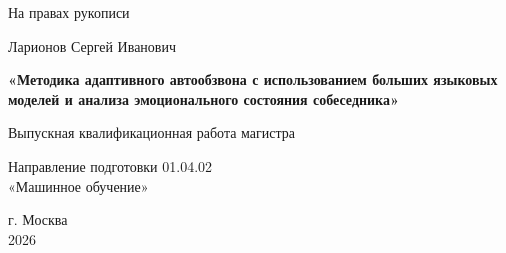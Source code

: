 \documentclass[a4paper,14pt]{extarticle}
\begin{document}
\begin{titlepage}
\fontsize{12pt}{14pt}\selectfont
\singlespacing
{}

\vspace{0.95cm}


\vspace{0.95cm}


\vspace{0.95cm}


\vspace{0.9cm}

\begin{flushright}
На правах рукописи

\vspace{0.2cm}

\VkrUdkField
\end{flushright}

\vspace{0.9cm}

\begin{center}
Ларионов Сергей Иванович

\vspace{0.85cm}

\textbf{«Методика адаптивного автообзвона с использованием больших языковых моделей и анализа эмоционального состояния собеседника»}

\vspace{1.0cm}

Выпускная квалификационная работа магистра

\vspace{0.75cm}

Направление подготовки 01.04.02\\
«Машинное обучение»
\end{center}

\vfill

\begin{center}
г. Москва\\
2026
\end{center}
\end{titlepage}

\setcounter{page}{2}
\hypersetup{pageanchor=true}
\end{document}
